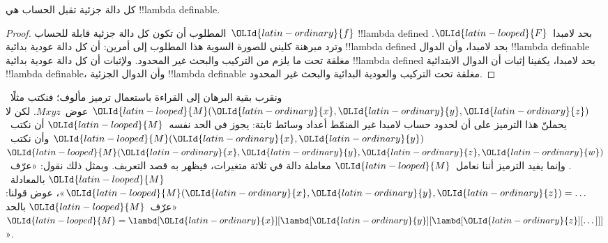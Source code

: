 \documentclass[../../../include/open-logic-section]{subfiles}
\begin{document}

\begin{thm}
كل دالة جزئية تقبل الحساب هي !!{lambda definable}.
\end{thm}

\begin{proof}
المطلوب أن تكون كل دالة جزئية قابلة للحساب~$\OLId{latin-ordinary}{f}$
!!{lambda defined} بحد لامبدا~$\OLId{latin-looped}{F}$.
وترد مبرهنة كليني للصورة السوية هذا المطلوب إلى أمرين:
أن كل دالة عودية بدائية !!{lambda defined} بحد لامبدا،
وأن الدوال !!{lambda definable} مغلقة تحت ما يلزم من
التركيب والبحث غير المحدود.
ولإثبات أن كل دالة عودية بدائية !!{lambda defined} بحد لامبدا،
يكفينا إثبات أن الدوال الابتدائية !!{lambda definable}،
وأن الدوال الجزئية !!{lambda definable} مغلقة تحت التركيب
والعودية البدائية والبحث غير المحدود.
\end{proof}

ونقرب بقية البرهان إلى القراءة باستعمال ترميز مألوف؛
فنكتب مثلًا~$\OLId{latin-looped}{M}(\OLId{latin-ordinary}{x}, \OLId{latin-ordinary}{y}, \OLId{latin-ordinary}{z})$ عوض~$Mxyz$.
لكن لا يحملنّ هذا الترميز على أن لحدود حساب لامبدا غير
المنمّط أعداد وسائط ثابتة: يجوز في الحد نفسه~$\OLId{latin-looped}{M}$
أن نكتب~$\OLId{latin-looped}{M}(\OLId{latin-ordinary}{x},\OLId{latin-ordinary}{y})$ وأن نكتب~$\OLId{latin-looped}{M}(\OLId{latin-ordinary}{x},\OLId{latin-ordinary}{y},\OLId{latin-ordinary}{z},\OLId{latin-ordinary}{w})$.
وإنما يفيد الترميز أننا نعامل~$\OLId{latin-looped}{M}$ معاملة دالة في ثلاثة
متغيرات، فيظهر به قصد التعريف.
وبمثل ذلك نقول: «عرّف~$\OLId{latin-looped}{M}$ بالمعادلة~$\OLId{latin-looped}{M}(\OLId{latin-ordinary}{x},\OLId{latin-ordinary}{y},\OLId{latin-ordinary}{z}) = \dots$»،
عوض قولنا: «عرّف~$\OLId{latin-looped}{M}$ بالحد~$\OLId{latin-looped}{M} = \lambd[\OLId{latin-ordinary}{x}][\lambd[\OLId{latin-ordinary}{y}][\lambd[\OLId{latin-ordinary}{z}][\dots]]]$».
\end{document}
